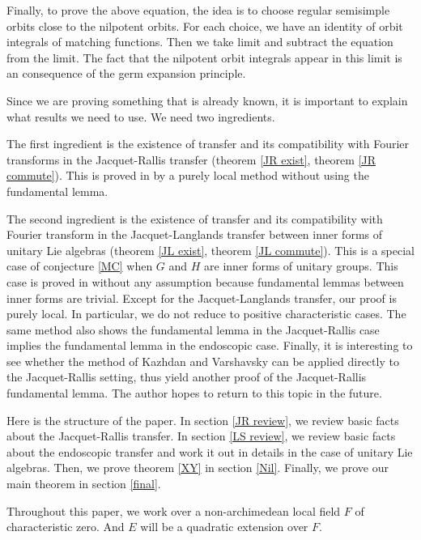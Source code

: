\documentclass[11pt, oneside,reqno]{amsart}   	%
\begin{document}
Finally, to prove the above equation, the idea is to choose regular semisimple orbits close to the nilpotent orbits. For each choice, we have an identity of orbit integrals of matching functions. Then we take limit and subtract the equation from the limit. The fact that the nilpotent orbit integrals appear in this limit is an consequence of the germ expansion principle.

\bigskip

Since we are proving something that is already known, it is important to explain what results we need to use. We need two ingredients.

The first ingredient is the existence of transfer and its compatibility with Fourier transforms in the Jacquet-Rallis transfer (theorem \ref{JR exist}, theorem \ref{JR commute}). This is proved in \cite{Wei1} by a purely local method without using the fundamental lemma.

The second ingredient is the existence of transfer and its compatibility with Fourier transform in the Jacquet-Langlands transfer between inner forms of unitary Lie algebras (theorem \ref{JL exist}, theorem \ref{JL commute}). This is a special case of conjecture \ref{MC} when $G$ and $H$ are inner forms of unitary groups. This case is proved in \cite{Wa2} without any assumption because fundamental lemmas between inner forms are trivial. Except for the Jacquet-Langlands transfer, our proof is purely local. In particular, we do not reduce to positive characteristic cases. The same method also shows the fundamental lemma in the Jacquet-Rallis case implies the fundamental lemma in the endoscopic case.  Finally, it is interesting to see whether the method of Kazhdan and Varshavsky can be applied directly to the Jacquet-Rallis setting, thus yield another proof of the Jacquet-Rallis fundamental lemma. The author hopes to return to this topic in the future.

\bigbreak

Here is the structure of the paper. In section \ref{JR review}, we review basic facts about the Jacquet-Rallis transfer. In section \ref{LS review}, we review basic facts about the endoscopic transfer and work it out in details in the case of unitary Lie algebras. Then, we prove theorem \ref{XY} in section \ref{Nil}. Finally, we prove our main theorem in section \ref{final}.


Throughout this paper, we work over a non-archimedean local field $F$ of characteristic zero.  And $E$ will be a quadratic extension over $F$.
\end{document}
